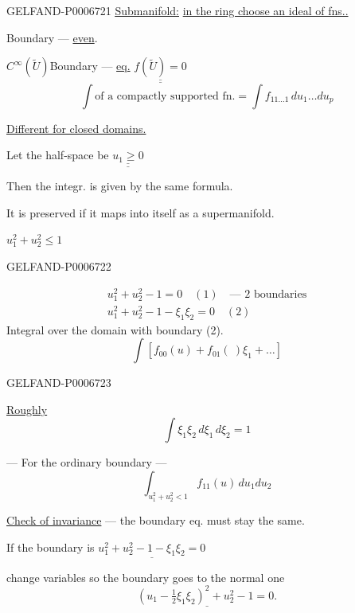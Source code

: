 \begin{GelfandAdjacentEvidence}{GELFAND-P000672}{1}
\underline{\underline{Submanifold:}} \underline{in the ring choose an ideal of fns..}

Boundary --- \underline{even}.

\(C^\infty(\widetilde U)\)\qquad Boundary --- \underline{eq.}
\(\underline{\underline{f(\widetilde U)=0}}\)
\[
\int \text{of a compactly supported fn.}=\int f_{11\ldots1}\,du_1\ldots du_p
\]

\underline{Different for closed domains.}

Let the half-space be \(\underline{\underline{u_1\ge0}}\)

Then the integr. is given by the same formula.

It is preserved if it maps into itself as a supermanifold.

\(u_1^2+u_2^2\le1\)
\end{GelfandAdjacentEvidence}
\begin{GelfandAdjacentEvidence}{GELFAND-P000672}{2}

\[
\begin{gathered}
u_1^2+u_2^2-1=0\quad(1)\quad\text{--- 2 boundaries}\\
u_1^2+u_2^2-1-\xi_1\xi_2=0\quad(2)
\end{gathered}
\]
Integral over the domain with boundary (2).
\[
\int[f_{00}(u)+f_{01}(\ )\xi_1+\ldots]
\]
\end{GelfandAdjacentEvidence}
\begin{GelfandAdjacentEvidence}{GELFAND-P000672}{3}


\underline{Roughly}
\[
\int\xi_1\xi_2\,d\xi_1\,d\xi_2=1
\]

--- For the ordinary boundary ---
\[
\int_{u_1^2+u_2^2<1}f_{11}(u)\,du_1du_2
\]

\underline{Check of invariance} --- the boundary eq. must stay the same.

If the boundary is \(\underline{u_1^2+u_2^2-1-\xi_1\xi_2=0}\)

change variables so the boundary goes to the normal one
\[
\underline{\left(u_1-\tfrac12\xi_1\xi_2\right)^2+u_2^2-1=0.}
\]
\end{GelfandAdjacentEvidence}
